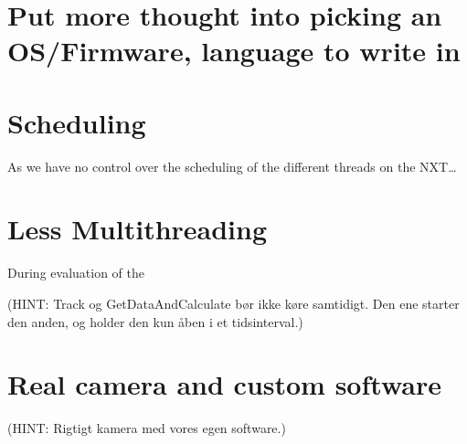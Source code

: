 \section{Put more thought into picking an OS/Firmware, language to write in}

\section{Scheduling}
As we have no control over the scheduling of the different threads on the NXT\ldots

\section{Less Multithreading}
During evaluation of the

(HINT: Track og GetDataAndCalculate bør ikke køre samtidigt. Den ene starter
  den anden, og holder den kun åben i et tidsinterval.)

\section{Real camera and custom software}
(HINT: Rigtigt kamera med vores egen software.)
